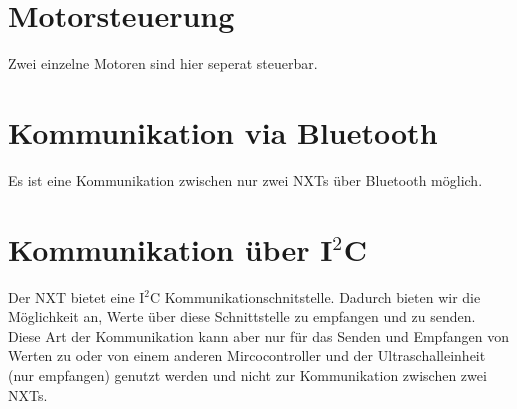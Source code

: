 \section{Motorsteuerung}
Zwei einzelne Motoren sind hier seperat steuerbar.

\section{Kommunikation via Bluetooth}
Es ist eine Kommunikation zwischen nur zwei NXTs über Bluetooth möglich.

\section{Kommunikation über I$^2$C}
Der NXT bietet eine I$^2$C Kommunikationschnitstelle. Dadurch bieten wir die Möglichkeit an, Werte über diese Schnittstelle zu empfangen und zu senden. Diese Art der Kommunikation kann aber nur für das Senden und  Empfangen von Werten zu oder von einem anderen Mircocontroller und der Ultraschalleinheit (nur empfangen) genutzt werden und nicht zur Kommunikation zwischen zwei NXTs.





